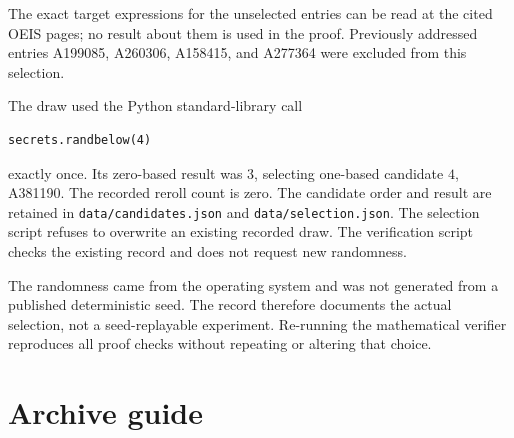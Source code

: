 \documentclass[11pt,letterpaper]{article}
\numberwithin{equation}{section}
\theoremstyle{definition}
\theoremstyle{remark}
\begin{document}
The exact target expressions for the unselected entries can be
read at the cited OEIS pages; no result about them is used in the
proof. Previously addressed entries A199085, A260306, A158415, and
A277364 were excluded from this selection.

The draw used the Python standard-library call
\begin{verbatim}
secrets.randbelow(4)
\end{verbatim}
exactly once. Its zero-based result was $3$, selecting one-based
candidate $4$, A381190. The recorded reroll count is zero. The
candidate order and result are retained in
\texttt{data/candidates.json} and \texttt{data/selection.json}.
The selection script refuses to overwrite an existing recorded
draw. The verification script checks the existing record and does
not request new randomness.

The randomness came from the operating system and was not generated
from a published deterministic seed. The record therefore documents
the actual selection, not a seed-replayable experiment. Re-running
the mathematical verifier reproduces all proof checks without
repeating or altering that choice.

\section{Archive guide}
\end{document}
